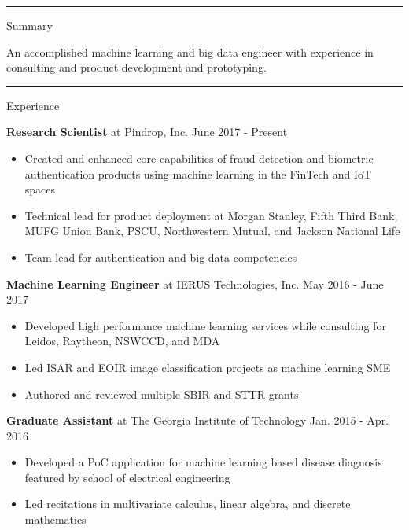 \documentclass[]{article}
\def \mysection[#1]{
\vspace{.4cm}
\hrule
\vspace{.4cm}
{\large #1 \par}
\vspace{.3cm}
}
\begin{document}
\par{\par} 

\vspace{.3cm}

\mysection[Summary] 
An accomplished machine learning and big data engineer with experience in consulting and product development and prototyping. 

\mysection[Experience]
\textbf{Research Scientist} at Pindrop, Inc. \hfill June 2017 - Present
\begin{itemize}[leftmargin=*, topsep=.5em, itemsep=.25em]
\item Created and enhanced core capabilities of fraud detection and biometric authentication products using machine learning in the FinTech and IoT spaces
\item Technical lead for product deployment at Morgan Stanley, Fifth Third Bank, MUFG Union Bank, PSCU, Northwestern Mutual, and Jackson National Life
\item Team lead for authentication and big data competencies 
\end{itemize}

\textbf{Machine Learning Engineer} at IERUS Technologies, Inc. \hfill May 2016 - June 2017
\begin{itemize}[leftmargin=*, topsep=.5em, itemsep=.25em]
\item Developed high performance machine learning services while consulting for Leidos, Raytheon, NSWCCD, and MDA
\item Led ISAR and EOIR image classification projects as machine learning SME
\item Authored and reviewed multiple SBIR and STTR grants
\end{itemize}

\textbf{Graduate Assistant} at The Georgia Institute of Technology \hfill Jan. 2015 - Apr. 2016
\begin{itemize}[leftmargin=*, topsep=.5em, itemsep=.25em]
\item Developed a PoC application for machine learning based disease diagnosis featured by school of electrical engineering
\item Led recitations in multivariate calculus, linear algebra, and discrete mathematics
\end{itemize}
\end{document}
